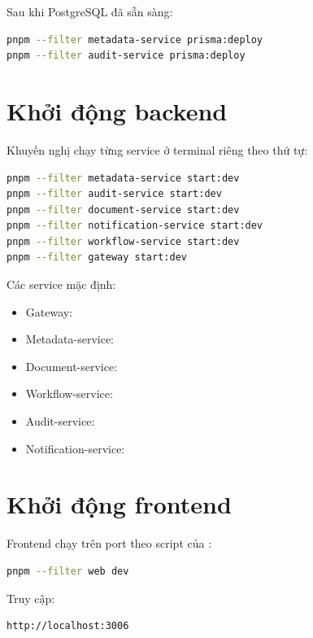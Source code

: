 Sau khi PostgreSQL đã sẵn sàng:

\begin{lstlisting}[language=bash]
pnpm --filter metadata-service prisma:deploy
pnpm --filter audit-service prisma:deploy
\end{lstlisting}

\section{Khởi động backend}

Khuyến nghị chạy từng service ở terminal riêng theo thứ tự:

\begin{lstlisting}[language=bash]
pnpm --filter metadata-service start:dev
pnpm --filter audit-service start:dev
pnpm --filter document-service start:dev
pnpm --filter notification-service start:dev
pnpm --filter workflow-service start:dev
pnpm --filter gateway start:dev
\end{lstlisting}

Các service mặc định:

\begin{itemize}
  \item Gateway: 
  \item Metadata-service: 
  \item Document-service: 
  \item Workflow-service: 
  \item Audit-service: 
  \item Notification-service: 
\end{itemize}

\section{Khởi động frontend}

Frontend chạy trên port  theo script  của :

\begin{lstlisting}[language=bash]
pnpm --filter web dev
\end{lstlisting}

Truy cập:

\begin{lstlisting}
http://localhost:3006
\end{lstlisting}

